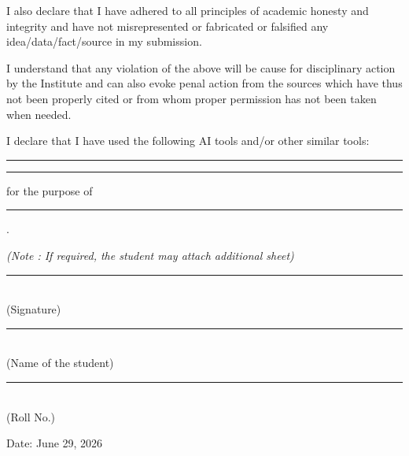 \documentclass[12pt,oneside]{book}
\begin{document}
\vspace{0.4cm}
\noindent\hspace{1cm}I also declare that I have adhered to all principles of academic honesty and integrity and have not misrepresented or fabricated or falsified any idea/data/fact/source in my submission.

\vspace{0.4cm}
\noindent\hspace{1cm}I understand that any violation of the above will be cause for disciplinary action by the Institute and can also evoke penal action from the sources which have thus not been properly cited or from whom proper permission has not been taken when needed.

\vspace{0.4cm}
\noindent\hspace{1cm}I declare that I have used the following AI tools and/or other similar tools:

\vspace{0.5cm}
\noindent\rule{\textwidth}{0.4pt}

\vspace{0.5cm}
\noindent\rule{\textwidth}{0.4pt}

\vspace{0.5cm}
\noindent for the purpose of \underline{\hspace{10cm}}

\vspace{0.5cm}
\noindent\rule{\textwidth}{0.4pt}.

\vspace{0.3cm}
\noindent\textit{(Note : If required, the student may attach additional sheet)}

\vspace{1.5cm}
\noindent\rule{8cm}{0.4pt}\\[1mm]
(Signature)

\vspace{0.5cm}
\noindent\rule{8cm}{0.4pt}\\[1mm]
(Name of the student)

\vspace{0.5cm}
\noindent\rule{8cm}{0.4pt}\\[1mm]
(Roll No.)

\vspace{0.5cm}
\noindent Date: June 29, 2026
\end{document}
